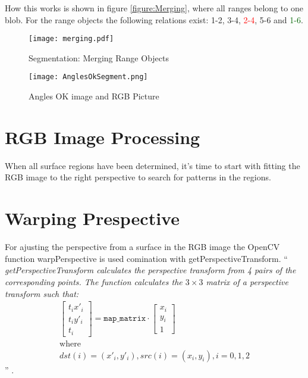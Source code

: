 How this works is shown in figure \vref{figure:Merging}, where all ranges belong to one blob. For the range objects
the following relations exist: 1-2, 3-4, \textcolor{red}{2-4}, 5-6 and \textcolor{darkgreen}{1-6}.

\begin{figure}[H]
\begin{center}
  \texttt{[image: merging.pdf]}
  \caption{Segmentation: Merging Range Objects}
  \label{figure:Merging}
\end{center}
\end{figure}
 



\begin{figure}[H]
\begin{center}
  \texttt{[image: AnglesOkSegment.png]}
  \caption[Angles OK Image and RGB Picture]{Angles OK image and RGB Picture\footnotemark}
  \label{figure:AnglesOKSeg}
\end{center}
\end{figure}
\newpage

\section{RGB Image Processing}

When all surface regions have been determined, it's time to start with fitting the RGB image 
to the right perspective to search for patterns in the regions. 


\section{Warping Prespective}
For ajusting the perspective from a surface in the RGB image the OpenCV function warpPerspective
 is used comination with getPerspectiveTransform.
``\textit{
getPerspectiveTransform calculates the perspective transform from 4 pairs of the corresponding points. The function 
calculates the $3 \times 3$ matrix of a perspective transform such that:
\begin{gather}
\begin{bmatrix} t_i x'_i \\ t_i y'_i \\ t_i \end{bmatrix} = \texttt{map\_matrix} \cdot \begin{bmatrix} x_i \\ y_i \\ 1 \end{bmatrix} 
\nonumber\\\mbox{where}\nonumber\\dst(i)=(x'_i,y'_i), src(i)=(x_i, y_i), i=0,1,2 
\end{gather}
}''
\cite{willowgarage:opencv:getPerspectiveTransform}.

